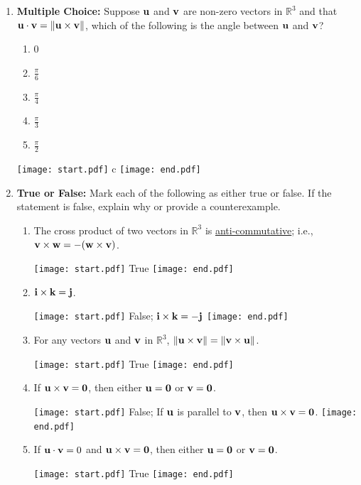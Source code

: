 \documentclass[12pt]{article}
\begin{document}
\begin{enumerate}
\begin{enumerate}
\end{enumerate}

\item {\bf Multiple Choice:} Suppose ${\bf u}$ and ${\bf v}$ are non-zero vectors in $\mathbb{R}^3$ and that ${\bf u}\cdot{\bf v}=\|{\bf u}\times{\bf v}\|$, which of the following is the angle between ${\bf u}$ and ${\bf v}$?

\begin{enumerate}

\item 0

\item $\frac{\pi}{6}$

\item $\frac{\pi}{4}$

\item $\frac{\pi}{3}$

\item $\frac{\pi}{2}$

\end{enumerate}

\texttt{[image: start.pdf]}
{{c}}
\texttt{[image: end.pdf]}


\item {\bf True or False:}  Mark each of the following as either true or false. If the statement is false, explain why or provide a counterexample.

\begin{enumerate}

\item The cross product of two vectors in $\mathbb{R}^3$ is \underline{anti-commutative}; i.e., ${\bf v}\times{\bf w}=-({\bf w}\times{\bf v})$.

\texttt{[image: start.pdf]}
{{True}}
\texttt{[image: end.pdf]}


\item ${\bf i}\times{\bf k}={\bf j}$.

\texttt{[image: start.pdf]}
{{False; ${\bf i}\times{\bf k}=-{\bf j}$}}
\texttt{[image: end.pdf]}


\item For any vectors ${\bf u}$ and ${\bf v}$ in $\mathbb{R}^3$, $\|{\bf u}\times{\bf v}\|=\|{\bf v}\times{\bf u}\|$.

\texttt{[image: start.pdf]}
{{True}}
\texttt{[image: end.pdf]}


\item If ${\bf u}\times{\bf v}={\bf 0}$, then either ${\bf u}={\bf 0}$ or ${\bf v}={\bf 0}$.

\texttt{[image: start.pdf]}
{{False; If ${\bf u}$ is parallel to ${\bf v}$, then ${\bf u}\times{\bf v}={\bf 0}$.}}
\texttt{[image: end.pdf]}


\item If ${\bf u}\cdot {\bf v}=0$ and ${\bf u}\times{\bf v}={\bf 0}$, then either ${\bf u}={\bf 0}$ or ${\bf v}={\bf 0}$.

\texttt{[image: start.pdf]}
{{True}}
\texttt{[image: end.pdf]}


\end{enumerate}

\end{enumerate}
\end{document}

